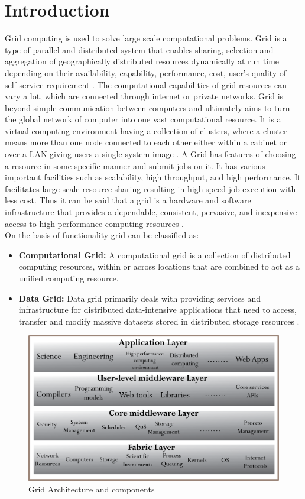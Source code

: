 \chapter{Introduction}
Grid computing is used to solve large scale computational problems. Grid is a type of parallel and distributed system that enables sharing, selection
and aggregation of geographically distributed resources dynamically at run time depending on their availability, capability, performance, cost, user's quality-of self-service requirement \cite{buyya2005gentle}. The computational capabilities of grid resources can vary a lot, which are connected through internet or private networks. Grid is beyond simple communication between computers and ultimately aims to turn the global network of computer into one vast computational resource. It is a virtual computing environment having a collection of clusters, where a cluster means more than one node connected to each other either within a cabinet or over a LAN giving users a single system image \cite{rajkumar1999architecture}. A Grid has features of choosing a resource in some specific manner and submit jobs on it. It has various important facilities such as scalability, high throughput, and high performance. It facilitates large scale resource sharing resulting in high speed job execution with less cost. Thus it can be said that a grid is a hardware and software infrastructure that provides a dependable, consistent, pervasive, and inexpensive access to high performance computing resources \cite{foster2002grid}. \\
On the basis of functionality grid can be classified as:
\begin{itemize}
\item \textbf{Computational Grid:} A computational grid is a collection of distributed computing resources, within or across locations that are combined
to act as a unified computing resource.
\item  \textbf{Data Grid:} Data grid primarily deals with providing services and infrastructure for distributed data-intensive applications that need to access, transfer
and modify massive datasets stored in distributed storage resources \cite{chervenak2000data}.
\end{itemize}
\begin{figure}[t]
    \centering
    \includegraphics[width=1.0\columnwidth]{architecture}
    \caption{Grid Architecture and components}
	\label{fig:arch}
\end{figure}

